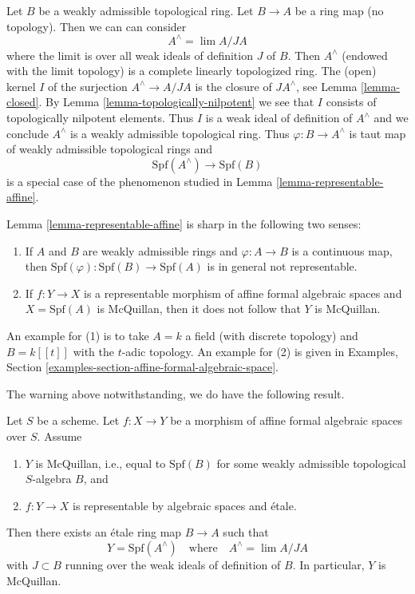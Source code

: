 \begin{example}
\label{example-representable-morphism-from-completion}
Let $B$ be a weakly admissible topological ring. Let $B \to A$ be
a ring map (no topology). Then we can can consider
$$
A^\wedge = \lim A/JA
$$
where the limit is over all weak ideals of definition $J$ of $B$.
Then $A^\wedge$ (endowed with the limit topology) is a
complete linearly topologized ring. The (open) kernel $I$
of the surjection $A^\wedge \to A/JA$ is the closure of $JA^\wedge$, see
Lemma \ref{lemma-closed}. By
Lemma \ref{lemma-topologically-nilpotent}
we see that $I$ consists of topologically nilpotent elements.
Thus $I$ is a weak ideal of definition of $A^\wedge$ and we conclude
$A^\wedge$ is a weakly admissible topological ring. Thus
$\varphi : B \to A^\wedge$ is taut map of weakly admissible
topological rings and
$$
\text{Spf}(A^\wedge) \longrightarrow \text{Spf}(B)
$$
is a special case of the phenomenon studied in
Lemma \ref{lemma-representable-affine}.
\end{example}

\begin{remark}[Warning]
\label{remark-warning}
Lemma \ref{lemma-representable-affine} is sharp in the following
two senses:
\begin{enumerate}
\item If $A$ and $B$ are weakly admissible rings and $\varphi : A \to B$
is a continuous map, then
$\text{Spf}(\varphi) : \text{Spf}(B) \to \text{Spf}(A)$ is in general
not representable.
\item If $f : Y \to X$ is a representable morphism of affine
formal algebraic spaces and $X = \text{Spf}(A)$ is McQuillan,
then it does not follow that $Y$ is McQuillan.
\end{enumerate}
An example for (1) is to take $A = k$ a field (with discrete topology)
and $B = k[[t]]$ with the $t$-adic topology.
An example for (2) is given in
Examples, Section \ref{examples-section-affine-formal-algebraic-space}.
\end{remark}

\noindent
The warning above notwithstanding, we do have the following result.

\begin{lemma}
\label{lemma-etale}
Let $S$ be a scheme. Let $f : X \to Y$ be a morphism of affine formal
algebraic spaces over $S$. Assume
\begin{enumerate}
\item $Y$ is McQuillan, i.e., equal to $\text{Spf}(B)$ for some
weakly admissible topological $S$-algebra $B$, and
\item $f : Y \to X$ is representable by algebraic spaces and \'etale.
\end{enumerate}
Then there exists an \'etale ring map $B \to A$ such that
$$
Y = \text{Spf}(A^\wedge)
\quad\text{where}\quad
A^\wedge = \lim A/JA
$$
with $J \subset B$ running over the weak ideals of definition of $B$.
In particular, $Y$ is McQuillan.
\end{lemma}

